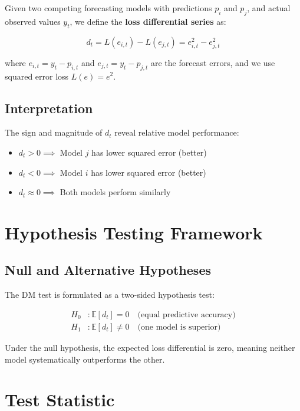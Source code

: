 \documentclass[11pt,a4paper]{article}
\begin{document}
Given two competing forecasting models with predictions $p_i$ and $p_j$, and actual observed values $y_t$, we define the \textbf{loss differential series} as:

\begin{equation}
d_t = L(e_{i,t}) - L(e_{j,t}) = e_{i,t}^2 - e_{j,t}^2
\end{equation}

where $e_{i,t} = y_t - p_{i,t}$ and $e_{j,t} = y_t - p_{j,t}$ are the forecast errors, and we use squared error loss $L(e) = e^2$.

\subsection{Interpretation}

The sign and magnitude of $d_t$ reveal relative model performance:

\begin{itemize}
    \item $d_t > 0 \implies$ Model $j$ has lower squared error (better)
    \item $d_t < 0 \implies$ Model $i$ has lower squared error (better)
    \item $d_t \approx 0 \implies$ Both models perform similarly
\end{itemize}

\section{Hypothesis Testing Framework}

\subsection{Null and Alternative Hypotheses}

The DM test is formulated as a two-sided hypothesis test:

\begin{align}
H_0 &: \mathbb{E}[d_t] = 0 \quad \text{(equal predictive accuracy)} \\
H_1 &: \mathbb{E}[d_t] \neq 0 \quad \text{(one model is superior)}
\end{align}

Under the null hypothesis, the expected loss differential is zero, meaning neither model systematically outperforms the other.

\section{Test Statistic}
\end{document}
